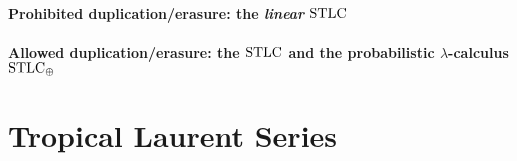 \documentclass[a4paper,UKenglish,cleveref, autoref, thm-restate]{lipics-v2021}
\begin{document}
\paragraph*{Prohibited duplication/erasure: the \emph{linear} $\mathrm{STLC}$}\label{sec:3A}


\paragraph*{Allowed duplication/erasure: the $\mathrm{STLC}$ and the probabilistic $\lambda$-calculus $\mathrm{STLC}_\oplus$}\label{sec:STLC+STLCO}






\section{Tropical Laurent Series}\label{sec:tls}





\end{document}
